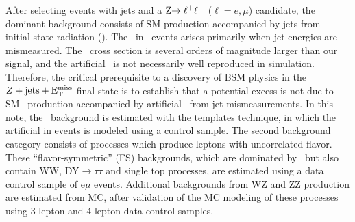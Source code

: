 After selecting events with jets and a $\Z\to\ell^+\ell^-$ ($\ell=e,\mu$) candidate,
the dominant background consists of SM \Z production accompanied by jets from initial-state radiation (\zjets).
The \MET\ in \zjets\ events arises primarily when jet energies are mismeasured.
The \zjets\ cross section is several orders of magnitude larger
than our signal, and the artificial \MET\ is not necessarily well reproduced in simulation.
Therefore, the critical prerequisite to a discovery of BSM physics in the $Z+\rm{jets}+\rm{E_{T}^{miss}}$ final state is 
to establish that a potential excess is not due to SM \zjets\ production accompanied by artificial 
\MET\ from jet mismeasurements. In this note, the \zjets\ background is estimated with the \MET templates technique,
in which the artificial \MET in \zjets events is modeled using a \gjets control sample.
The second background category consists of processes which produce leptons with uncorrelated flavor. 
These ``flavor-symmetric'' (FS) backgrounds, which are dominated by \ttbar\ but also contain WW, DY$\to\tau\tau$
and single top processes, are estimated using a data control sample of e$\mu$ events.
Additional backgrounds from WZ and ZZ production are estimated from MC, after validation of the MC modeling
of these processes using 3-lepton and 4-lepton data control samples.

